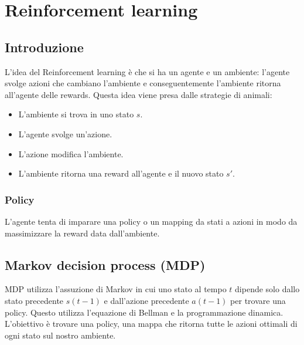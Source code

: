 \chapter{Reinforcement learning}

\section{Introduzione}
L'idea del Reinforcement learning \`e che si ha un agente e un ambiente: l'agente svolge azioni che cambiano l'ambiente e conseguentemente l'ambiente ritorna all'agente delle rewards.
Questa idea viene presa dalle strategie di animali:
\begin{itemize}
	\item L'ambiente si trova in uno stato $s$.
	\item L'agente svolge un'azione.
	\item L'azione modifica l'ambiente.
	\item L'ambiente ritorna una reward all'agente e il nuovo stato $s'$.
\end{itemize}

	\subsection{Policy}
	L'agente tenta di imparare una policy o un mapping da stati a azioni in modo da massimizzare la reward data dall'ambiente.
	
	\section{Markov decision process (MDP)}
	MDP utilizza l'assuzione di Markov in cui uno stato al tempo $t$ dipende solo dallo stato precedente $s(t-1)$ e dall'azione precedente $a(t-1)$ per trovare una policy.
	Questo utilizza l'equazione di Bellman e la programmazione dinamica.
	L'obiettivo \`e trovare una policy, una mappa che ritorna tutte le azioni ottimali di ogni stato sul nostro ambiente.
	
